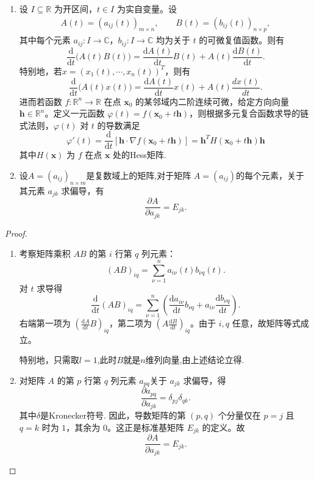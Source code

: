 \documentclass[../../main.tex]{subfiles}%
\begin{document}
\begin{theorem}[矩阵偏导运算的基本性质]
\label{theorem:矩阵偏导运算的基本性质}
\begin{enumerate}[(1)]
\item 设 $I\subseteq\mathbb R$ 为开区间，$t\in I$ 为实自变量。设
\begin{align*}
A(t)=(a_{ij}(t))_{m\times n},\qquad B(t)=(b_{ij}(t))_{n\times p},
\end{align*}
其中每个元素 $a_{ij}:I\to\mathbb C$，$b_{ij}:I\to\mathbb C$ 均为关于 $t$ 的可微复值函数。则有
\[
\frac{\mathrm{d}}{\mathrm{d}t}\big(A(t)B(t)\big)=\frac{\mathrm{d}A\left( t \right)}{\mathrm{d}t}B(t)+A(t)\frac{\mathrm{d}B\left( t \right)}{\mathrm{d}t}.
\]
特别地，若$x=(x_1(t),\cdots,x_n(t))^T$，则有
\[
\frac{\mathrm{d}}{\mathrm{d}t}\big(A(t)x(t)\big)=\frac{\mathrm{d}A\left( t \right)}{\mathrm{d}t}x(t)+A(t)\frac{dx(t)}{dt}.
\]
进而若函数 \(f: \mathbb{R}^n \to \mathbb{R}\) 在点 \(\boldsymbol{x}_0\) 的某邻域内二阶连续可微，给定方向向量 \(\boldsymbol{h} \in \mathbb{R}^n\)。定义一元函数 \(\varphi(t) = f(\boldsymbol{x}_0 + t\boldsymbol{h})\)，则根据多元复合函数求导的链式法则，\(\varphi(t)\) 对 \(t\) 的导数满足
\begin{equation*}
\varphi'(t) = \frac{\mathrm{d}}{\mathrm{d}t} \left[ \boldsymbol{h} \cdot \nabla f(\boldsymbol{x}_0 + t\boldsymbol{h}) \right] = \boldsymbol{h}^T H(\boldsymbol{x}_0 + t\boldsymbol{h}) \boldsymbol{h}
\end{equation*}
其中\(H(\boldsymbol{x})\) 为 \(f\) 在点 \(\boldsymbol{x}\) 处的Hess矩阵.

\item 设$A=(a_{ij})_{n\times m}$是复数域上的矩阵,对于矩阵 \(A = (a_{ij})\)的每个元素，关于其元素 \(a_{jk}\) 求偏导，有
\[
\frac{\partial A}{\partial a_{jk}} = E_{jk}.
\]
\end{enumerate}
\end{theorem}
\begin{proof}
\begin{enumerate}[(1)]
\item 考察矩阵乘积 \(AB\) 的第 \(i\) 行第 \(q\) 列元素：
\[
(AB)_{iq}=\sum_{\nu=1}^{n} a_{i\nu}(t)b_{\nu q}(t).
\]
对 \(t\) 求导得
\[
\frac{\mathrm{d}}{\mathrm{d}t}(AB)_{iq}=\sum_{\nu =1}^n{\left( \frac{\mathrm{d}a_{i\nu}}{\mathrm{d}t}b_{\nu q}+a_{i\nu}\frac{\mathrm{d}b_{\nu q}}{\mathrm{d}t} \right)}.
\]
右端第一项为 \(\left(\frac{\mathrm{d}A}{\mathrm{d}t}B\right)_{iq}\)，第二项为 \(\left(A\frac{\mathrm{d}B}{\mathrm{d}t}\right)_{iq}\)。由于 \(i,q\) 任意，故矩阵等式成立。

特别地，只需取$l=1$,此时$B$就是$n$维列向量,由上述结论立得.

\item 对矩阵 \(A\) 的第 \(p\) 行第 \(q\) 列元素 \(a_{pq}\)关于 \(a_{jk}\) 求偏导，得
\[
\frac{\partial a_{pq}}{\partial a_{jk}} = \delta_{pj} \delta_{qk}.
\]
其中$\delta$是Kronecker符号.
因此，导数矩阵的第 \((p,q)\) 个分量仅在 \(p=j\) 且 \(q=k\) 时为 \(1\)，其余为 \(0\)。这正是标准基矩阵 \(E_{jk}\) 的定义。故
\[
\frac{\partial A}{\partial a_{jk}} = E_{jk}.
\]
\end{enumerate}
\end{proof}
\end{document}
